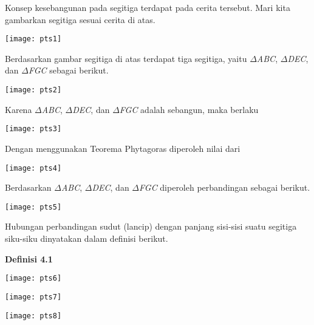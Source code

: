 \documentclass[11pt,fleqn]{book} %
\begin{document}
\noindent Konsep kesebangunan pada segitiga terdapat pada cerita tersebut. Mari kita gambarkan segitiga sesuai cerita di atas.

\noindent 

\noindent \texttt{[image: pts1]}

\noindent Berdasarkan gambar segitiga di atas terdapat tiga segitiga, yaitu $\Delta$\textit{ABC}, $\Delta$\textit{DEC}, dan $\Delta$\textit{FGC }sebagai berikut.

\noindent 

\noindent \texttt{[image: pts2]}

\noindent 

\noindent Karena $\Delta$\textit{ABC}, $\Delta$\textit{DEC}, dan $\Delta$\textit{FGC }adalah sebangun, maka berlaku

\noindent 

\noindent \texttt{[image: pts3]}

\noindent 

\noindent Dengan menggunakan Teorema Phytagoras diperoleh nilai dari

\noindent 

\noindent \texttt{[image: pts4]}

\noindent 

\noindent Berdasarkan $\Delta$\textit{ABC}, $\Delta$\textit{DEC}, dan $\Delta$\textit{FGC }diperoleh perbandingan sebagai berikut.

\noindent 

\noindent \texttt{[image: pts5]}

\noindent 

\noindent Hubungan perbandingan sudut (lancip) dengan panjang sisi-sisi suatu segitiga siku-siku dinyatakan dalam definisi berikut.

\noindent 

\noindent 

\noindent \textbf{Definisi 4.1}

\noindent \textbf{}

\noindent \texttt{[image: pts6]} 

\noindent \texttt{[image: pts7]}

\noindent \texttt{[image: pts8]}
\end{document}
